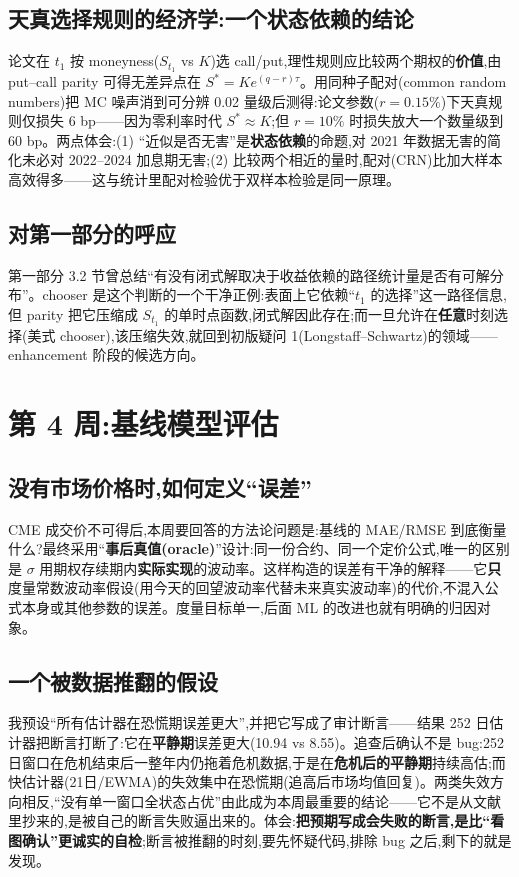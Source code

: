 \documentclass[11pt]{ctexart}
\begin{document}
\subsection{天真选择规则的经济学:一个状态依赖的结论}
论文在 $t_1$ 按 moneyness($S_{t_1}$ vs $K$)选 call/put,理性规则应比较两个期权的\textbf{价值},由 put--call parity 可得无差异点在 $S^*=Ke^{(q-r)\tau}$。用同种子配对(common random numbers)把 MC 噪声消到可分辨 0.02 量级后测得:论文参数($r=0.15\%$)下天真规则仅损失 6 bp——因为零利率时代 $S^*\approx K$;但 $r=10\%$ 时损失放大一个数量级到 60 bp。两点体会:(1) ``近似是否无害''是\textbf{状态依赖}的命题,对 2021 年数据无害的简化未必对 2022--2024 加息期无害;(2) 比较两个相近的量时,配对(CRN)比加大样本高效得多——这与统计里配对检验优于双样本检验是同一原理。

\subsection{对第一部分的呼应}
第一部分 3.2 节曾总结``有没有闭式解取决于收益依赖的路径统计量是否有可解分布''。chooser 是这个判断的一个干净正例:表面上它依赖``$t_1$ 的选择''这一路径信息,但 parity 把它压缩成 $S_{t_1}$ 的单时点函数,闭式解因此存在;而一旦允许在\textbf{任意}时刻选择(美式 chooser),该压缩失效,就回到初版疑问 1(Longstaff--Schwartz)的领域——enhancement 阶段的候选方向。

\section{第 4 周:基线模型评估}

\subsection{没有市场价格时,如何定义``误差''}
CME 成交价不可得后,本周要回答的方法论问题是:基线的 MAE/RMSE 到底衡量什么?最终采用``\textbf{事后真值(oracle)}''设计:同一份合约、同一个定价公式,唯一的区别是 $\sigma$ 用期权存续期内\textbf{实际实现}的波动率。这样构造的误差有干净的解释——它\textbf{只}度量常数波动率假设(用今天的回望波动率代替未来真实波动率)的代价,不混入公式本身或其他参数的误差。度量目标单一,后面 ML 的改进也就有明确的归因对象。

\subsection{一个被数据推翻的假设}
我预设``所有估计器在恐慌期误差更大'',并把它写成了审计断言——结果 252 日估计器把断言打断了:它在\textbf{平静期}误差更大(10.94 vs 8.55)。追查后确认不是 bug:252 日窗口在危机结束后一整年内仍拖着危机数据,于是在\textbf{危机后的平静期}持续高估;而快估计器(21日/EWMA)的失效集中在恐慌期(追高后市场均值回复)。两类失效方向相反,``没有单一窗口全状态占优''由此成为本周最重要的结论——它不是从文献里抄来的,是被自己的断言失败逼出来的。体会:\textbf{把预期写成会失败的断言,是比``看图确认''更诚实的自检};断言被推翻的时刻,要先怀疑代码,排除 bug 之后,剩下的就是发现。
\end{document}
